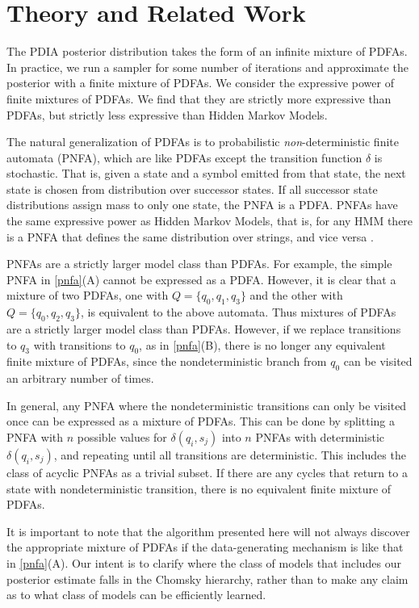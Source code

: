 \section{Theory and Related Work}
\label{theory}

The PDIA posterior distribution takes the form of an infinite mixture of PDFAs.  In practice, we run a sampler for some number of iterations and approximate the posterior with a finite mixture of PDFAs.  We consider the expressive power of finite mixtures of PDFAs.  We find that they are strictly more expressive than PDFAs, but strictly less expressive than Hidden Markov Models.

The natural generalization of PDFAs is to probabilistic {\em non}-deterministic finite automata (PNFA), which are like PDFAs except the transition function $\delta$ is stochastic.  That is, given a state and a symbol emitted from that state, the next state is chosen from distribution over successor states.  If all successor state distributions assign mass to only one state, the PNFA is a PDFA.  PNFAs have the same expressive power as Hidden Markov Models, that is, for any HMM there is a PNFA that defines the same distribution over strings, and vice versa \cite{Dupont2005}.

PNFAs are a strictly larger model class than PDFAs.  For example, the simple PNFA in \ref{pnfa}(A) cannot be expressed as a PDFA.  However, it is clear that a mixture of two PDFAs, one with $Q = \{q_0,q_1,q_3\}$ and the other with $Q = \{q_0,q_2,q_3\}$, is equivalent to the above automata.  Thus mixtures of PDFAs are a strictly larger model class than PDFAs.  However, if we replace transitions to $q_3$ with transitions to $q_0$, as in \ref{pnfa}(B), there is no longer any equivalent finite mixture of PDFAs, since the nondeterministic branch from $q_0$ can be visited an arbitrary number of times.  

In general, any PNFA where the nondeterministic transitions can only be visited once can be expressed as a mixture of PDFAs.  This can be done by splitting a PNFA with $n$ possible values for $\delta(q_i,s_j)$ into $n$ PNFAs with deterministic $\delta(q_i,s_j)$, and repeating until all transitions are deterministic.  This includes the class of acyclic PNFAs as a trivial subset.  If there are any cycles that return to a state with nondeterministic transition, there is no equivalent finite mixture of PDFAs.

It is important to note that the algorithm presented here will not always discover the appropriate mixture of PDFAs if the data-generating mechanism is like that in \ref{pnfa}(A).  Our intent is to clarify where the class of models that includes our posterior estimate falls in the Chomsky hierarchy, rather than to make any claim as to what class of models can be efficiently learned.


